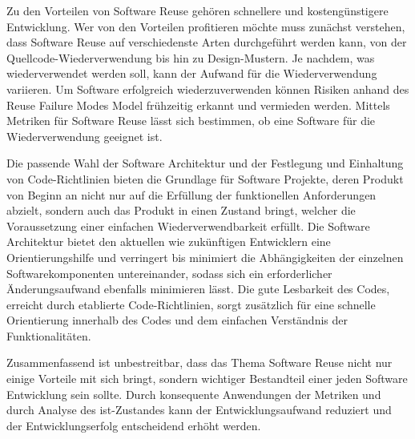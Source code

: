\documentclass[utf8,biblatex]{lni}
\begin{document}
Zu den Vorteilen von Software Reuse gehören schnellere und kostengünstigere Entwicklung. Wer von den Vorteilen profitieren möchte muss zunächst verstehen, dass Software Reuse auf verschiedenste Arten durchgeführt werden kann, von der Quellcode-Wiederverwendung bis hin zu Design-Mustern. Je nachdem, was wiederverwendet werden soll, kann der Aufwand für die Wiederverwendung variieren. Um Software erfolgreich wiederzuverwenden können Risiken anhand des Reuse Failure Modes Model frühzeitig erkannt und vermieden werden. Mittels Metriken für Software Reuse lässt sich bestimmen, ob eine Software für die Wiederverwendung geeignet ist.

Die passende Wahl der Software Architektur und der Festlegung und Einhaltung von Code-Richtlinien bieten die Grundlage für Software Projekte, deren Produkt von Beginn an nicht nur auf die Erfüllung der funktionellen Anforderungen abzielt, sondern auch das Produkt in einen Zustand bringt, welcher die Voraussetzung einer einfachen Wiederverwendbarkeit erfüllt. Die Software Architektur bietet den aktuellen wie zukünftigen Entwicklern eine Orientierungshilfe und verringert bis minimiert die Abhängigkeiten der einzelnen Softwarekomponenten untereinander, sodass sich ein erforderlicher Änderungsaufwand ebenfalls minimieren lässt. Die gute Lesbarkeit des Codes, erreicht durch etablierte Code-Richtlinien, sorgt zusätzlich für eine schnelle Orientierung innerhalb des Codes und dem einfachen Verständnis der Funktionalitäten.

Zusammenfassend ist unbestreitbar, dass das Thema Software Reuse nicht nur einige Vorteile mit sich bringt, sondern wichtiger Bestandteil einer jeden Software Entwicklung sein sollte. Durch konsequente Anwendungen der Metriken und durch Analyse des ist-Zustandes kann der Entwicklungsaufwand reduziert und der Entwicklungserfolg entscheidend erhöht werden.

\newpage

\printbibliography
\end{document}

